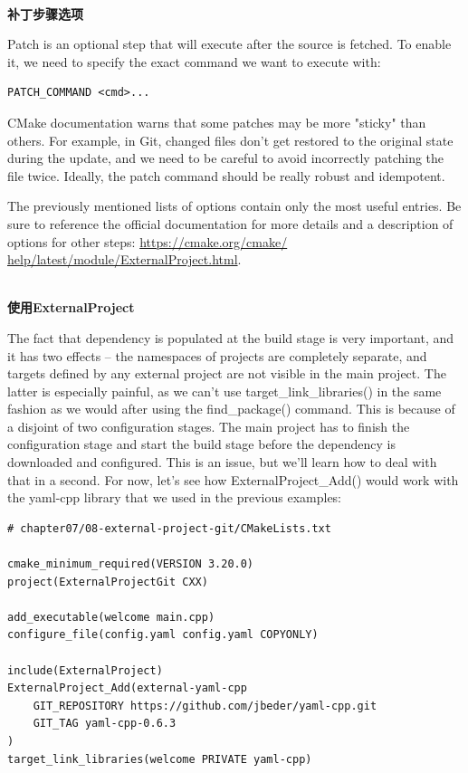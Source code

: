 \hspace*{\fill} \\ %
\noindent
\textbf{补丁步骤选项}

Patch is an optional step that will execute after the source is fetched. To enable it, we need to specify the exact command we want to execute with:

\begin{lstlisting}[style=styleCMake]
PATCH_COMMAND <cmd>...
\end{lstlisting} 

CMake documentation warns that some patches may be more "sticky" than others. For example, in Git, changed files don't get restored to the original state during the update, and we need to be careful to avoid incorrectly patching the file twice. Ideally, the patch command should be really robust and idempotent.

\begin{tcolorbox}[colback=blue!5!white,colframe=blue!75!black,title=重要的Note]
The previously mentioned lists of options contain only the most useful entries. Be sure to reference the official documentation for more details and a description of options for other steps: \url{https://cmake.org/cmake/ help/latest/module/ExternalProject.html}.
\end{tcolorbox}

\hspace*{\fill} \\ %
\noindent
\textbf{使用ExternalProject}

The fact that dependency is populated at the build stage is very important, and it has two effects – the namespaces of projects are completely separate, and targets defined by any external project are not visible in the main project. The latter is especially painful, as we can't use target\_link\_libraries() in the same fashion as we would after using the find\_package() command. This is because of a disjoint of two configuration stages. The main project has to finish the configuration stage and start the build stage before the dependency is downloaded and configured. This is an issue, but we'll learn how to deal with that in a second. For now, let's see how ExternalProject\_Add() would work with the yaml-cpp library that we used in the previous examples:

\begin{lstlisting}[style=styleCMake]
# chapter07/08-external-project-git/CMakeLists.txt

cmake_minimum_required(VERSION 3.20.0)
project(ExternalProjectGit CXX)

add_executable(welcome main.cpp)
configure_file(config.yaml config.yaml COPYONLY)

include(ExternalProject)
ExternalProject_Add(external-yaml-cpp
	GIT_REPOSITORY https://github.com/jbeder/yaml-cpp.git
	GIT_TAG yaml-cpp-0.6.3
)
target_link_libraries(welcome PRIVATE yaml-cpp)
\end{lstlisting} 

